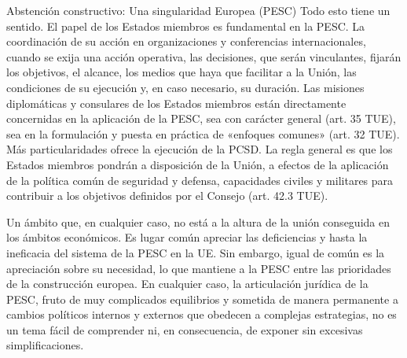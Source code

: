 \documentclass[10pt,a4paper]{article}
\begin{document}
\begin{speial}{Abstención constructivo: Una singularidad Europea (PESC)}
    Todo esto tiene un sentido. El papel de los Estados miembros es fundamental en la PESC. La coordinación de su acción en organizaciones y conferencias internacionales, cuando se exija una acción operativa, las decisiones, que serán vinculantes, fijarán los objetivos, el alcance, los medios que haya que facilitar a la Unión, las condiciones de su ejecución y, en caso necesario, su duración. Las misiones diplomáticas y consulares de los Estados miembros están directamente concernidas en la aplicación de la PESC, sea con carácter general (art. 35 TUE), sea en la formulación y puesta en práctica de «enfoques comunes» (art. 32 TUE). Más particularidades ofrece la ejecución de la PCSD. La regla general es que los Estados miembros pondrán a disposición de la Unión, a efectos de la aplicación de la política común de seguridad y defensa, capacidades civiles y militares para contribuir a los objetivos definidos por el Consejo (art. 42.3 TUE).
\end{speial}

Un ámbito que, en cualquier caso, no está a la altura de la unión conseguida en los ámbitos económicos. Es lugar común apreciar las deficiencias y hasta la ineficacia del sistema de la PESC en la UE. Sin embargo, igual de común es la apreciación sobre su necesidad, lo que mantiene a la PESC entre las prioridades de la construcción europea. En cualquier caso, la articulación jurídica de la PESC, fruto de muy complicados equilibrios y sometida de manera permanente a cambios políticos internos y externos que obedecen a complejas estrategias, no es un tema fácil de comprender ni, en consecuencia, de exponer sin excesivas simplificaciones. 
\end{document}
